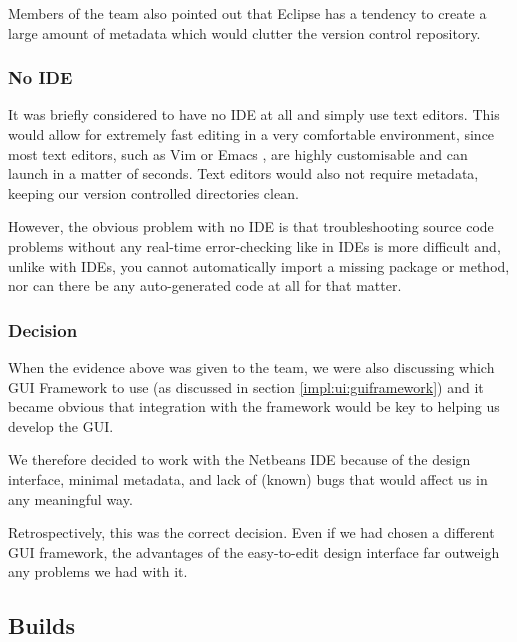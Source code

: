 Members of the team also pointed out that Eclipse has a tendency to
create a large amount of metadata which would clutter the version
control repository.

\subsubsection{No IDE}
\label{impl:ui:ide:noide}

It was briefly considered to have no IDE at all and simply use text
editors.
This would allow for extremely fast editing in a very comfortable
environment, since most text editors, such as Vim \cite{vim} or Emacs
\cite{emacs}, are highly customisable and can launch in a matter of
seconds.
Text editors would also not require metadata, keeping our version
controlled directories clean.

However, the obvious problem with no IDE is that troubleshooting
source code problems without any real-time error-checking like in IDEs
is more difficult and, unlike with IDEs, you cannot automatically
import a missing package or method, nor can there be any
auto-generated code at all for that matter.

\subsubsection{Decision}
\label{impl:ui:ide:decision}

When the evidence above was given to the team, we were also discussing
which GUI Framework to use (as discussed in section
\ref{impl:ui:guiframework}) and it became obvious that integration
with the framework would be key to helping us develop the GUI.

We therefore decided to work with the Netbeans IDE because of the
design interface, minimal metadata, and lack of (known) bugs that
would affect us in any meaningful way.

Retrospectively, this was the correct decision.
Even if we had chosen a different GUI framework, the advantages of the
easy-to-edit design interface far outweigh any problems we had with
it.

\subsection{Builds}
\label{impl:ui:builds}


